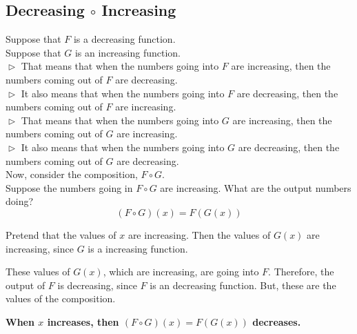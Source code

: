 \documentclass{ximera}
\begin{document}
\subsection{Decreasing $\circ$ Increasing}


Suppose that $F$ is a decreasing function. \\
Suppose that $G$ is an increasing function. \\


$\vartriangleright$ That means that when the numbers going into $F$ are increasing, then the numbers coming out of $F$ are decreasing. \\

$\vartriangleright$ It also means that when the numbers going into $F$ are decreasing, then the numbers coming out of $F$ are increasing. \\



$\vartriangleright$ That means that when the numbers going into $G$ are increasing, then the numbers coming out of $G$ are increasing. \\


$\vartriangleright$ It also means that when the numbers going into $G$ are decreasing, then the numbers coming out of $G$ are decreasing. \\



Now, consider the composition, $F \circ G$. \\


Suppose the numbers going in $F \circ G$ are increasing.  What are the output numbers doing? \\




\[ (F \circ G)(x) = F(G(x)) \]


Pretend that the values of $x$ are increasing. Then the values of $G(x)$ are increasing, since $G$ is a increasing function.

These values of $G(x)$, which are increasing, are going into $F$.  Therefore, the output of $F$ is decreasing, since $F$ is an decreasing function.  But, these are the values of the composition.


\begin{center}
\textbf{\textcolor{red!80!black}{When $x$ increases, then $(F \circ G)(x) = F(G(x))$ decreases.}}
\end{center}
\end{document}
